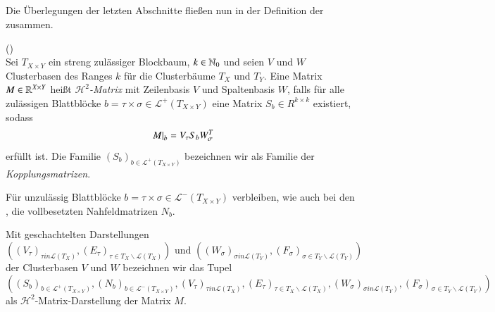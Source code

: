     \subsection{\hquad}
    \label{sec:hquad}
      Die Überlegungen der letzten Abschnitte fließen nun in der Definition der \hquad zusammen.
      
      \begin{defn}
	(\hquad)\\
	Sei $T_{X \times Y}$ ein streng zulässiger Blockbaum, $k \in \mathbb{N}_0$ und seien $V$ und $W$ Clusterbasen des Ranges $k$ für die Clusterbäume $T_X$ und $T_Y$. Eine Matrix 
	$M \in \mathbb{R}^{X \times Y}$ heißt \textit{$\mathcal{H}^2$-Matrix} mit Zeilenbasis $V$ und Spaltenbasis $W$, falls für alle zulässigen Blattblöcke 
	$b = \tau \times \sigma \in \mathcal{L}^+\left(T_{X \times Y}\right)$ eine Matrix $S_b \in R^{k \times k}$ existiert, sodass
	\begin{equation*}
	  \left. M \right|_b = V_\tau S_b W_\sigma^T
	\end{equation*}
	erfüllt ist. Die Familie $\left(S_b\right)_{b \in \mathcal{L}^+\left(T_{X \times Y}\right)}$ bezeichnen wir als Familie der \textit{Kopplungsmatrizen}.
      \end{defn}
      
      Für unzulässig Blattblöcke $b = \tau \times \sigma \in \mathcal{L}^-\left(T_{X \times Y}\right)$ verbleiben, wie auch bei den \hmat, die vollbesetzten Nahfeldmatrizen $N_b$.
      
      Mit geschachtelten Darstellungen 
      \[
      \left( 
	\left(V_\tau \right)_{\tau in \mathcal{L}\left(T_X\right)} , \left(E_\tau\right)_{\tau \in T_X \backslash \mathcal{L}\left(T_X\right)} \right) \text{ und }
	\left( \left(W_\sigma\right)_{\sigma in \mathcal{L}\left(T_Y\right)} , \left(F_\sigma\right)_{\sigma \in T_Y \backslash \mathcal{L}\left(T_Y\right)}
      \right) 
      \]
      der Clusterbasen $V$ und $W$ bezeichnen wir das Tupel
      \[
       \left(
	\left(S_b\right)_{b \in \mathcal{L}^+\left(T_{X \times Y}\right)} , \left(N_b\right)_{b \in \mathcal{L}^-\left(T_{X \times Y}\right)},
	\left(V_\tau\right)_{\tau in \mathcal{L}\left(T_X\right)} , \left(E_\tau\right)_{\tau \in T_X \backslash \mathcal{L}\left(T_X\right)},
	\left(W_\sigma\right)_{\sigma in \mathcal{L}\left(T_Y\right)} , \left(F_\sigma\right)_{\sigma \in T_Y \backslash \mathcal{L}\left(T_Y\right)}
       \right)
      \]
      als $\mathcal{H}^2$-Matrix-Darstellung der Matrix $M$.

